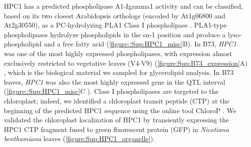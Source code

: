 \documentclass[9pt,twocolumn,twoside,lineno]{biorxiv}
\newcommand{\hpc}{\textit{HPC1}\xspace}
\begin{document}
HPC1 has a predicted phospholipase A1-Igamma1 activity and can be classified, based on its two closest Arabidopsis orthologs (encoded by At1g06800 and At2g30550), as a PC-hydrolyzing PLA1 Class I phospholipase \cite{Ryu2004-iv}. 
PLA1-type phospholipases hydrolyze phospholipids in the sn-1 position and produce a lyso-phospholipid and a free fatty acid (\cref{figure::Sup:HPC1_misc}B). 
In B73, \hpc was one of the most highly expressed phospholipases, with expression almost exclusively restricted to vegetative leaves (V4-V9) (\cref{figure:Sup:B73_expression}A) \cite{Stelpflug2016-vr}, which is the biological material we sampled for glycerolipid analysis. 
In B73 leaves, \hpc was also the most highly expressed gene in the QTL interval (\cref{figure::Sup:HPC1_misc}C \cite{Stelpflug2016-vr}).
Class I phospholipases are targeted to the chloroplast; indeed, we identified a chloroplast transit peptide (CTP) at the beginning of the predicted HPC1 sequence using the online tool ChloroP \cite{Emanuelsson1999-rs}.
We validated the chloroplast localization of HPC1 by transiently expressing  the HPC1 CTP fragment fused to green fluorescent protein (GFP) in \textit{Nicotiana benthamiana} leaves (\cref{figure:Sup:HPC1_organelle}).
\end{document}
